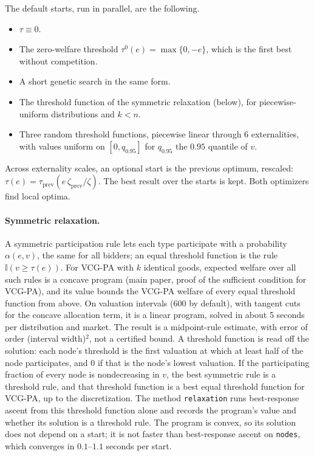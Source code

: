 \documentclass[11pt]{article}
\newcommand{\code}[1]{\texttt{#1}}
\begin{document}
The default starts, run in parallel, are the following.
\begin{itemize}
    \item $\tau\equiv0$.
    \item The zero-welfare threshold $\tau^0(e)=\max\{0,-e\}$, which is the first best without competition.
    \item A short genetic search in the same form.
    \item The threshold function of the symmetric relaxation (below), for piecewise-uniform distributions and $k<n$.
    \item Three random threshold functions, piecewise linear through 6 externalities, with values uniform on $[0,q_{0.95}]$ for $q_{0.95}$ the $0.95$ quantile of $v$.
\end{itemize}
Across externality scales, an optional start is the previous optimum, rescaled: $\tau(e)=\tau_{\mathrm{prev}}(e\,\zeta_{\mathrm{prev}}/\zeta)$. The best result over the starts is kept. Both optimizers find local optima.

\paragraph{Symmetric relaxation.} A symmetric participation rule lets each type participate with a probability $\alpha(e,v)$, the same for all bidders; an equal threshold function is the rule $\mathbb{I}(v\geq\tau(e))$. For VCG-PA with $k$ identical goods, expected welfare over all such rules is a concave program (main paper, proof of the sufficient condition for VCG-PA), and its value bounds the VCG-PA welfare of every equal threshold function from above. On valuation intervals (600 by default), with tangent cuts for the concave allocation term, it is a linear program, solved in about 5 seconds per distribution and market. The result is a midpoint-rule estimate, with error of order (interval width)$^2$, not a certified bound. A threshold function is read off the solution: each node's threshold is the first valuation at which at least half of the node participates, and $0$ if that is the node's lowest valuation. If the participating fraction of every node is nondecreasing in $v$, the best symmetric rule is a threshold rule, and that threshold function is a best equal threshold function for VCG-PA, up to the discretization. The method \code{relaxation} runs best-response ascent from this threshold function alone and records the program's value and whether its solution is a threshold rule. The program is convex, so its solution does not depend on a start; it is not faster than best-response ascent on \code{nodes}, which converges in $0.1$--$1.1$ seconds per start.
\end{document}
